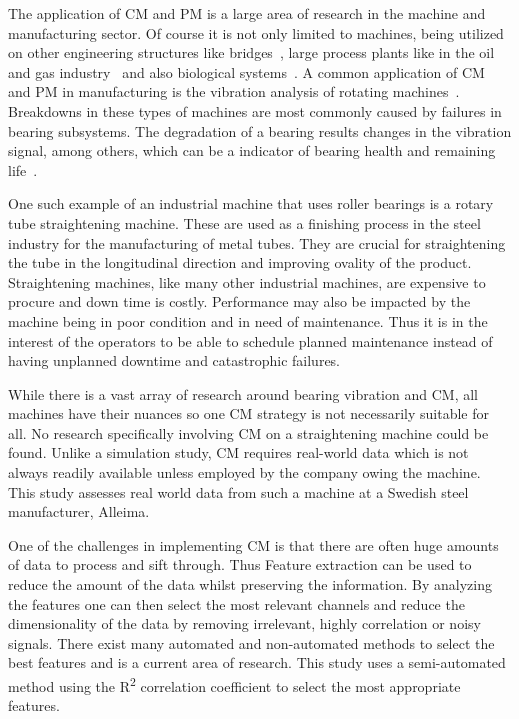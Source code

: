 \documentclass[]{article}
\begin{document}
The application of \gls{CM} and \gls{PM} is a large area of research in the machine and manufacturing sector. Of course it is not only limited to machines, being utilized on other engineering structures like bridges~\cite{buckley2023feature}, large process plants like in the oil and gas industry~\cite{telford2011condition} and also biological systems~\cite{tolocsi2011classification}. 
A common application of \gls{CM} and \gls{PM} in manufacturing is the vibration analysis of rotating machines~\cite{tiboni2022review, kateris2014machine}. Breakdowns in these types of machines are most commonly caused by failures in bearing subsystems. The degradation of a bearing results changes in the vibration signal, among others, which can be a indicator of bearing health and remaining life~\cite{zhang2016degradation}. 

One such example of an industrial machine that uses roller bearings is a rotary tube straightening machine. These are used as a finishing process in the steel industry for the manufacturing of metal tubes. They are crucial for straightening the tube in the longitudinal direction and improving ovality of the product. 
Straightening machines, like many other industrial machines, are expensive to procure and down time is costly. Performance may also be impacted by the machine being in poor condition and in need of maintenance. Thus it is in the interest of the operators to be able to schedule planned maintenance instead of having unplanned downtime and catastrophic failures.

While there is a vast array of research around bearing vibration and \gls{CM}, all machines have their nuances so one \gls{CM} strategy is not necessarily suitable for all. No research specifically involving \gls{CM} on a straightening machine could be found. Unlike a simulation study, \gls{CM} requires real-world data which is not always readily available unless employed by the company owing the machine. This study assesses real world data from such a machine at a Swedish steel manufacturer, Alleima.

One of the challenges in implementing \gls{CM} is that there are often huge amounts of data to process and sift through. Thus Feature extraction can be used to reduce the amount of the data whilst preserving the information. By analyzing the features one can then select the most relevant channels and reduce the dimensionality of the data by removing irrelevant, highly correlation or noisy signals. There exist many automated and non-automated methods to select the best features and is a current area of research. This study uses a semi-automated method using the R\textsuperscript{2} correlation coefficient to select the most appropriate features.
\end{document}
